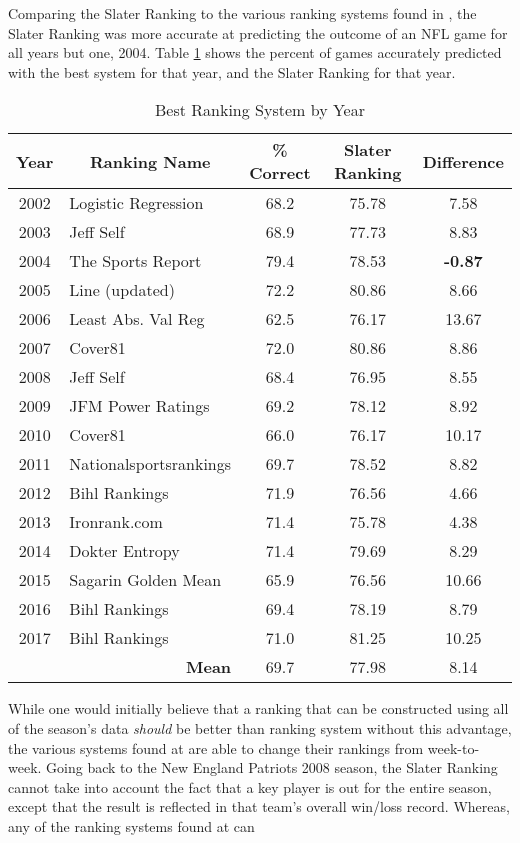 \documentclass[11pt]{article}
\begin{document}
Comparing the Slater Ranking to the various ranking systems found in \cite{prediction_tracker}, the Slater Ranking was more accurate at predicting the outcome of an NFL game for all years but one, 2004. Table \ref{table:ranking_year} shows the percent of games accurately predicted with the best system for that year, and the Slater Ranking for that year.

\begin{table}[!htb]
\begin{center}
\scriptsize
\begin{tabular}{|c|l|c|c|c|}
\hline
Year & \multicolumn{1}{|c|}{Ranking Name} & \% Correct & Slater Ranking & Difference\\
\hline
2002 & Logistic Regression & 68.2 & 75.78 & 7.58\\
2003 & Jeff Self & 68.9 & 77.73 & 8.83\\
2004 & The Sports Report & 79.4 & 78.53 & \textbf{-0.87}\\
2005 & Line (updated) & 72.2 & 80.86 & 8.66\\
2006 & Least Abs. Val Reg & 62.5 & 76.17 & 13.67\\
2007 & Cover81 & 72.0 & 80.86 & 8.86\\
2008 & Jeff Self & 68.4 & 76.95 & 8.55\\
2009 & JFM Power Ratings & 69.2 & 78.12 & 8.92\\
2010 & Cover81 & 66.0 & 76.17 & 10.17\\
2011 & Nationalsportsrankings & 69.7 & 78.52 & 8.82\\
2012 & Bihl Rankings & 71.9 & 76.56 & 4.66\\
2013 & Ironrank.com & 71.4 & 75.78 & 4.38\\
2014 & Dokter Entropy & 71.4 & 79.69 & 8.29\\
2015 & Sagarin Golden Mean & 65.9 & 76.56 & 10.66\\
2016 & Bihl Rankings & 69.4 & 78.19 & 8.79\\
2017 & Bihl Rankings & 71.0 & 81.25 & 10.25\\
\hline
 & \multicolumn{1}{|r|}{\textbf{Mean}} & 69.7 & 77.98 & 8.14\\
\hline
\end{tabular}
\caption{Best Ranking System by Year}\label{table:ranking_year}
\end{center}
\end{table}

While one would initially believe that a ranking that can be constructed using all of the season's data \emph{should} be better than ranking system without this advantage, the various systems found at \cite{prediction_tracker} are able to change their rankings from week-to-week. Going back to the New England Patriots 2008 season, the Slater Ranking cannot take into account the fact that a key player is out for the entire season, except that the result is reflected in that team's overall win/loss record. Whereas, any of the ranking systems found at \cite{prediction_tracker} can 
\end{document}
